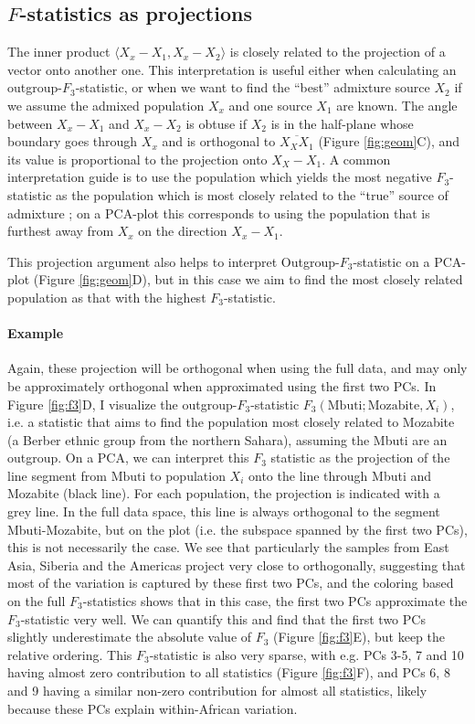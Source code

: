\documentclass[12pt,fullpage, a4paper]{article}
\begin{document}
\subsection{$F$-statistics as projections}
The inner product $\langle X_x - X_1, X_x - X_2 \rangle$ is closely related to the projection of a vector onto another one. This interpretation is useful either when calculating an outgroup-$F_3$-statistic, or when we want to find the ``best'' admixture source $X_2$ if we assume the admixed population $X_x$ and one source $X_1$ are known.  The angle between $X_x - X_1$ and $X_x - X_2$ is obtuse if $X_2$ is in the half-plane whose boundary goes through $X_x$ and is orthogonal to $\overline{X_XX_1}$ (Figure \ref{fig:geom}C), and its value is proportional to the projection onto $X_X - X_1$. A common interpretation guide is to use the population which yields the most negative $F_3$-statistic as the population which is most closely related to the ``true'' source of admixture \citep{patterson2012}; on a PCA-plot this corresponds to using the population that is furthest away from $X_x$ on the direction $X_x - X_1$.

This projection argument also helps to interpret Outgroup-$F_3$-statistic on a PCA-plot (Figure \ref{fig:geom}D), but in this case we aim to find the most closely related population as that with the highest $F_3$-statistic. 

\paragraph{Example}
Again, these projection will be orthogonal when using the full data, and may only be approximately orthogonal when approximated using the first two PCs. In Figure \ref{fig:f3}D, I visualize the outgroup-$F_3$-statistic $F_3(\text{Mbuti}; \text{Mozabite}, X_i)$, i.e. a statistic that aims to find the population most closely related to Mozabite (a Berber ethnic group from the northern Sahara), assuming the Mbuti are an outgroup. On a PCA, we can interpret this $F_3$ statistic as the projection of the line segment from $\text{Mbuti}$ to population $X_i$ onto the line through Mbuti and Mozabite (black line). For each population, the projection is indicated with a grey line. In the full data space, this line is always orthogonal to the segment Mbuti-Mozabite, but on the plot (i.e. the subspace spanned by the first two PCs), this is not necessarily the case. We see that particularly the samples from East Asia, Siberia and the Americas project very close to orthogonally, suggesting that most of the variation is captured by these first two PCs, and the coloring based on the full $F_3$-statistics shows that in this case, the first two PCs approximate the $F_3$-statistic very well. We can quantify this and find that the first two PCs slightly underestimate the absolute value of $F_3$ (Figure \ref{fig:f3}E), but keep the relative ordering. This $F_3$-statistic is also very sparse, with e.g. PCs 3-5, 7 and 10 having almost zero contribution to all statistics (Figure \ref{fig:f3}F), and PCs 6, 8 and 9 having a similar non-zero contribution for almost all statistics, likely because these PCs explain within-African variation.
\end{document}
